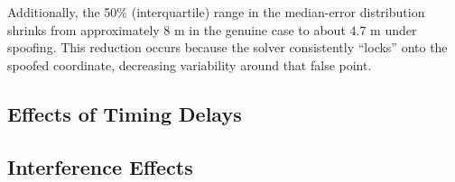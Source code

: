         \noindent
        Additionally, the 50\% (interquartile) range in the median-error distribution shrinks from approximately 8 m in the genuine case to about 4.7 m under spoofing. This reduction occurs because the solver consistently “locks” onto the spoofed coordinate, decreasing variability around that false point.

    \subsection{Effects of Timing Delays}
    


    \subsection{Interference Effects}
    

